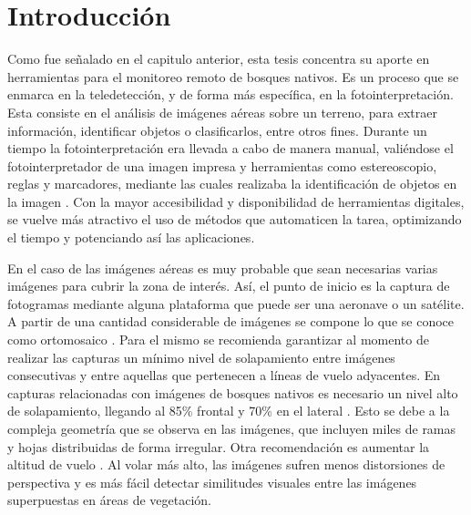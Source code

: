 \section{Introducción}
Como fue señalado en el capitulo anterior, esta tesis concentra su aporte en herramientas para el monitoreo remoto de bosques nativos.
Es un proceso que se enmarca en la teledetección, y de forma más específica, en la fotointerpretación. Esta consiste en el análisis de imágenes aéreas sobre un terreno, para extraer información, identificar objetos o clasificarlos, entre otros fines. 
Durante un tiempo la fotointerpretación era llevada a cabo de manera manual, valiéndose el fotointerpretador de una imagen impresa y herramientas como estereoscopio, reglas y marcadores, mediante las cuales realizaba la identificación de objetos en la imagen \cite{noauthor_teledeteccion_nodate,hernandez_tecnologias_2011,garcia_introduccion_nodate}. Con la mayor accesibilidad y disponibilidad de herramientas digitales, se vuelve más atractivo el uso de métodos que automaticen la tarea, optimizando el tiempo y potenciando así las aplicaciones.

En el caso de las imágenes aéreas es muy probable que sean necesarias varias imágenes para cubrir la zona de interés. Así, el punto de inicio es la captura de fotogramas mediante alguna plataforma que puede ser una aeronave o un satélite. A partir de una cantidad considerable de imágenes se compone lo que se conoce como ortomosaico \cite{liba_accuracy_2015}. Para el mismo se recomienda garantizar al momento de realizar las capturas  un mínimo nivel de solapamiento entre imágenes consecutivas y entre aquellas que pertenecen a líneas de vuelo adyacentes. En capturas relacionadas con imágenes de bosques nativos es necesario un nivel alto de solapamiento, llegando al 85\% frontal y 70\% en el lateral \cite{sestari_rpas_2019,dandois_optimal_2015,seifert_influence_2019}. Esto se debe a la compleja geometría que se observa en las imágenes, que incluyen miles de ramas y hojas distribuidas de forma irregular. Otra recomendación es aumentar la altitud de vuelo \cite{bhatt_image_2022}. Al volar más alto, las imágenes sufren menos distorsiones de perspectiva y es más fácil detectar similitudes visuales entre las imágenes superpuestas en áreas de vegetación.

